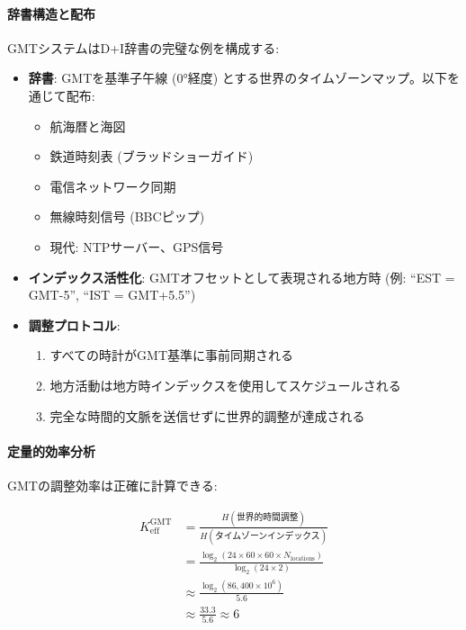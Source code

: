 \documentclass[11pt,a4paper]{article}
\begin{document}
	\paragraph{辞書構造と配布}
	GMTシステムはD+I辞書の完璧な例を構成する:
	
	\begin{itemize}
		\item \textbf{辞書}: GMTを基準子午線 (0°経度) とする世界のタイムゾーンマップ。以下を通じて配布:
		\begin{itemize}
			\item 航海暦と海図
			\item 鉄道時刻表 (ブラッドショーガイド)
			\item 電信ネットワーク同期
			\item 無線時刻信号 (BBCピップ)
			\item 現代: NTPサーバー、GPS信号
		\end{itemize}
		
		\item \textbf{インデックス活性化}: GMTオフセットとして表現される地方時 (例: ``EST = GMT-5'', ``IST = GMT+5.5'')
		
		\item \textbf{調整プロトコル}: 
		\begin{enumerate}
			\item すべての時計がGMT基準に事前同期される
			\item 地方活動は地方時インデックスを使用してスケジュールされる
			\item 完全な時間的文脈を送信せずに世界的調整が達成される
		\end{enumerate}
	\end{itemize}
	
	\paragraph{定量的効率分析}
	GMTの調整効率は正確に計算できる:
	
	\begin{align}
		K_{\mathrm{eff}}^{\mathrm{GMT}} &= \frac{H(\text{世界的時間調整})}{H(\text{タイムゾーンインデックス})} \\
		&= \frac{\log_2\left(24 \times 60 \times 60 \times N_{\text{locations}}\right)}{\log_2(24 \times 2)} \\
		&\approx \frac{\log_2(86,400 \times 10^6)}{5.6} \\
		&\approx \frac{33.3}{5.6} \approx 6
	\end{align}
	
\end{document}
